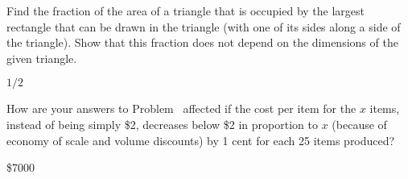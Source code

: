 \begin{enumialphparenastyle}
%

\begin{ex}
Find the fraction of the area of a triangle that is occupied by the largest
rectangle that can be drawn in the triangle (with one of its sides along a
side of the triangle).  Show that this fraction does not depend on the
dimensions of the given triangle.
\begin{sol}
 $1/2$
\end{sol}
\end{ex}

\begin{ex}
How are your answers to Problem~
 affected if the cost per item for the $x$
items, instead of being simply \$2, decreases below \$2 in proportion to
$x$ (because of economy of scale and volume discounts) by 1 cent for each
25 items produced?
\begin{sol}
 \$7000
\end{sol}
\end{ex}


\end{enumialphparenastyle}

